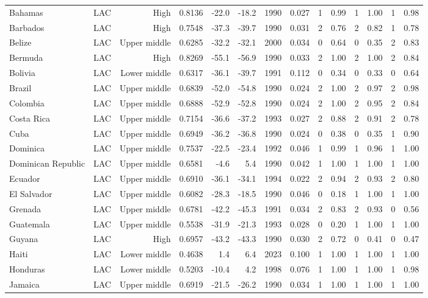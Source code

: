 \begin{longtable}{llrrrrrrrrrrrr}
Bahamas & LAC & High & 0.8136 & -22.0 & -18.2 & 1990 & 0.027 & 1 & 0.99 & 1 & 1.00 & 1 & 0.98 \\
Barbados & LAC & High & 0.7548 & -37.3 & -39.7 & 1990 & 0.031 & 2 & 0.76 & 2 & 0.82 & 1 & 0.78 \\
Belize & LAC & Upper middle & 0.6285 & -32.2 & -32.1 & 2000 & 0.034 & 0 & 0.64 & 0 & 0.35 & 2 & 0.83 \\
Bermuda & LAC & High & 0.8269 & -55.1 & -56.9 & 1990 & 0.033 & 2 & 1.00 & 2 & 1.00 & 2 & 0.84 \\
Bolivia & LAC & Lower middle & 0.6317 & -36.1 & -39.7 & 1991 & 0.112 & 0 & 0.34 & 0 & 0.33 & 0 & 0.64 \\
Brazil & LAC & Upper middle & 0.6839 & -52.0 & -54.8 & 1990 & 0.024 & 2 & 1.00 & 2 & 0.97 & 2 & 0.98 \\
Colombia & LAC & Upper middle & 0.6888 & -52.9 & -52.8 & 1990 & 0.024 & 2 & 1.00 & 2 & 0.95 & 2 & 0.84 \\
Costa Rica & LAC & Upper middle & 0.7154 & -36.6 & -37.2 & 1993 & 0.027 & 2 & 0.88 & 2 & 0.91 & 2 & 0.78 \\
Cuba & LAC & Upper middle & 0.6949 & -36.2 & -36.8 & 1990 & 0.024 & 0 & 0.38 & 0 & 0.35 & 1 & 0.90 \\
Dominica & LAC & Upper middle & 0.7537 & -22.5 & -23.4 & 1992 & 0.046 & 1 & 0.99 & 1 & 0.96 & 1 & 1.00 \\
Dominican Republic & LAC & Upper middle & 0.6581 &  -4.6 &   5.4 & 1990 & 0.042 & 1 & 1.00 & 1 & 1.00 & 1 & 1.00 \\
Ecuador & LAC & Upper middle & 0.6910 & -36.1 & -34.1 & 1994 & 0.022 & 2 & 0.94 & 2 & 0.93 & 2 & 0.80 \\
El Salvador & LAC & Upper middle & 0.6082 & -28.3 & -18.5 & 1990 & 0.046 & 0 & 0.18 & 1 & 1.00 & 1 & 1.00 \\
Grenada & LAC & Upper middle & 0.6781 & -42.2 & -45.3 & 1991 & 0.034 & 2 & 0.83 & 2 & 0.93 & 0 & 0.56 \\
Guatemala & LAC & Upper middle & 0.5538 & -31.9 & -21.3 & 1993 & 0.028 & 0 & 0.20 & 1 & 1.00 & 1 & 1.00 \\
Guyana & LAC & High & 0.6957 & -43.2 & -43.3 & 1990 & 0.030 & 2 & 0.72 & 0 & 0.41 & 0 & 0.47 \\
Haiti & LAC & Lower middle & 0.4638 &   1.4 &   6.4 & 2023 & 0.100 & 1 & 1.00 & 1 & 1.00 & 1 & 1.00 \\
Honduras & LAC & Lower middle & 0.5203 & -10.4 &   4.2 & 1998 & 0.076 & 1 & 1.00 & 1 & 1.00 & 1 & 0.98 \\
Jamaica & LAC & Upper middle & 0.6919 & -21.5 & -26.2 & 1990 & 0.034 & 1 & 1.00 & 1 & 1.00 & 1 & 1.00 \\

\end{longtable}
